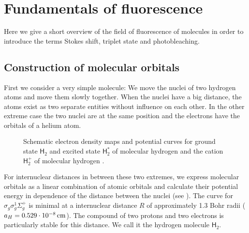 \newenvironment{fenster}{%
  \begin{addmargin*}[
  5em]{5em}%
    \begin{minipage}{\linewidth}%
    \vspace{1em}
      \rule{\linewidth}{2pt}%
}{%
    \rule[
.25\baselineskip]{\linewidth}{2pt}%
\vspace{1em}
    \end{minipage}%
  \end{addmargin*}%
}
\renewcommand{\H}{\textsf{H}}
\renewcommand{\O}{\textsf{O}}
\section{Fundamentals of fluorescence}
\begin{summary}
  Here we give a short overview of the field of fluorescence of
  molecules in order to introduce the terms Stokes shift, triplet
  state and photobleaching.
\end{summary}
\subsection{Construction of molecular orbitals}
First we consider a very simple molecule: We move the nuclei of two
hydrogen atoms and move them slowly together. When the nuclei have a
big distance, the atoms exist as two separate entities without
influence on each other. In the other extreme case the two nuclei are
at the same position and the electrons have the orbitals of a helium
atom.
\begin{figure}[!hbt]
  \centering
  
  \caption{Schematic electron density maps and potential curves for
    ground state $\H_2$ and excited state $\H_2^*$ of molecular
    hydrogen and the cation $\H_2^+$ of molecular hydrogen
    \citep[after][p.~258]{Haken2006}.}
  \label{fig:flu-potential_my}
\end{figure}

For internuclear distances in between these two extremes, we express
molecular orbitals as a linear combination of atomic orbitals and
calculate their potential energy in dependence of the distance between
the nuclei (see ). The curve for
$\sigma_g\sigma_g^1\Sigma_g^+$ is minimal at a internuclear distance
$R$ of approximately 1.3 Bohr radii
($a_H=\unit[0.529\cdot10^{-8}]{cm}$). The compound of two protons and
two electrons is particularly stable for this distance. We call it the
hydrogen molecule $\H_2$.

